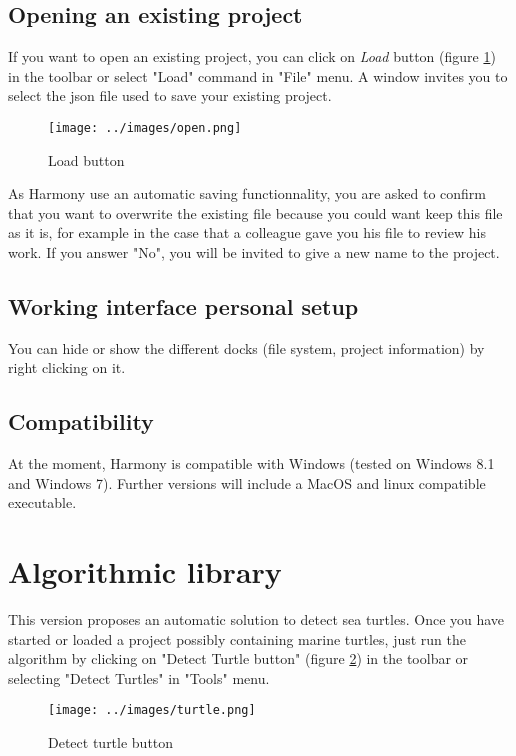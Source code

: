 \documentclass{article}
\begin{document}
\subsection{Opening an existing project}
If you want to open an existing project, you can click on \emph{Load} button (figure \ref{fig:LoadButton}) in the toolbar or select "Load" command in "File" menu. A window invites you to select the json file used to save your existing project.

\begin{figure}[!h]
  \centering
  \texttt{[image: ../images/open.png]} 
  \caption{\label{fig:LoadButton} Load button }
\end{figure}

As Harmony use an automatic saving functionnality, you are asked to confirm that you want to overwrite the existing file because you could want keep this file as it is, for example in the case that a colleague gave you his file to review his work. If you answer "No", you will be invited to give a new name to the project.

\subsection{Working interface personal setup}
You can hide or show the different docks (file system, project information) by right clicking on it.

\subsection{Compatibility}
At the moment, Harmony is compatible with Windows (tested on Windows 8.1 and Windows 7). Further versions will include a MacOS and linux compatible executable.

\section{Algorithmic library}
\label{sec:algo}
This version proposes an automatic solution to detect sea turtles. Once you have started or loaded a project possibly containing marine turtles, just run the algorithm by clicking on "Detect Turtle button" (figure \ref{fig:DetectTurtleButton}) in the toolbar or selecting "Detect Turtles" in "Tools" menu.

\begin{figure}[!h]
  \centering
  \texttt{[image: ../images/turtle.png]} 
  \caption{\label{fig:DetectTurtleButton} Detect turtle button }
\end{figure}
\end{document}
